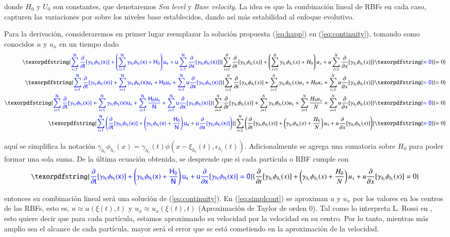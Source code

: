 \documentclass[spanish]{article} %
\providecommand{\DIFaddtex}[1]{{\protect\color{blue} \sf #1}} %
\providecommand{\DIFadd}[1]{\texorpdfstring{\DIFaddtex{#1}}{#1}} %
\begin{document}
     \DIFadd{donde $H_0$ y $U_0$ son constantes, que denotaremos \textit{Sea level} y \textit{Base velocity}. La idea es que la
     combinación lineal de RBFs en cada caso, capturen las variaciones por sobre los niveles base establecidos, dando así
     más estabilidad al enfoque evolutivo.
}

     \DIFadd{Para la derivación, consideraremos en primer lugar reemplazar la solución propuesta (\ref{eq:happ}) en (\ref{eq:continuity}), tomando como conocidos $u$ y $u_x$ en un tiempo dado
     }\begin{align*}\DIFadd{
     \sum_{i=1}^{N} \frac{\partial}{\partial t}[\gamma_{h_i}\phi_{h_i}(x)] + \left(\sum_{i=1}^{N} \gamma_{h_i} \phi_{h_i}(x) + H_0\right) u_x + u \sum_{i=1}^N \frac{\partial}{\partial x}[\gamma_{h_i}\phi_{h_i}(x)] }& \DIFadd{= 0 }\\
     \DIFadd{\sum_{i=1}^{N} \frac{\partial}{\partial t}[\gamma_{h_i}\phi_{h_i}(x)] + \sum_{i=1}^{N} \gamma_{h_i} \phi_{h_i}(x)u_x + H_0 u_x +  \sum_{i=1}^N u \frac{\partial}{\partial x}[\gamma_{h_i}\phi_{h_i}(x)] }& \DIFadd{= 0 }\\
     \DIFadd{\sum_{i=1}^{N} \frac{\partial}{\partial t}[\gamma_{h_i}\phi_{h_i}(x)] + \sum_{i=1}^{N} \gamma_{h_i} \phi_{h_i}(x)u_x + \sum_{i=1}^{N} \frac{H_0 u_x}{N} +  \sum_{i=1}^N u \frac{\partial}{\partial x}[\gamma_{h_i}\phi_{h_i}(x)] }& \DIFadd{= 0 }\\
     \DIFadd{\sum_{i=1}^N \left(\frac{\partial}{\partial t}[\gamma_{h_i}\phi_{h_i}(x)] + \left(\gamma_{h_i} \phi_{h_i}(x) + \frac{H_0}{N}\right)u_x + u \frac{\partial}{\partial x}[\gamma_{h_i}\phi_{h_i}(x)]\right) }& \DIFadd{= 0
     }\end{align*}

     \noindent \DIFadd{aquí se simplifica la notación $\displaystyle \gamma_{h_i}\phi_{h_i}(x) = \gamma_{h_i}(t)\phi(x-\xi_{h_i}(t),\epsilon_{h_i}(t))$. Adicionalmente se agrega una sumatoria sobre $H_0$ para poder formar una sola suma. De la última ecuación obtenida, se desprende que si cada partícula o RBF cumple con
     }\begin{align}\DIFadd{
          \frac{\partial}{\partial t}[\gamma_{h_i}\phi_{h_i}(x)] + \left(\gamma_{h_i} \phi_{h_i}(x) + \frac{H_0}{N}\right)u_x + u \frac{\partial}{\partial x}[\gamma_{h_i}\phi_{h_i}(x)] = 0
          \label{eq:simplcont}
      }\end{align}

      \noindent \DIFadd{entonces su combinación lineal será una solución de (\ref{eq:continuity}). En (\ref{eq:simplcont}) se aproximan $u$ y $u_x$ por los valores en los centros de las RBFs, esto es, $u \approx u(\xi(t),t)$ y $u_x \approx u_x(\xi(t),t)$ (Aproximación de Taylor de orden $0$). Tal como lo interpreta L. Rossi en \cite{rossi}, esto quiere decir que para cada partícula, estamos aproximando su velocidad por la velocidad en su centro. Por lo tanto, mientras más amplio sea el alcance de cada partícula, mayor será el error que se está cometiendo en la aproximación de la velocidad.
}
\end{document}
